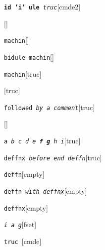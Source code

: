 \documentclass{book}
\begin{document}
%
\noindent\texttt{\textbf{id `\texttt{i}' ule} \bgroup{}\normalfont{}\textsl{truc}\egroup{}}\hfill[cmde2]



%
\noindent\texttt{}\hfill[]



\noindent\texttt{machin}\hfill[]



%
\noindent\texttt{bidule machin}\hfill[]



%
\noindent\texttt{machin}\hfill[truc]



%
\noindent\texttt{}\hfill[truc]



\noindent\texttt{followed \bgroup{}\normalfont{}\textsl{by a comment}\egroup{}}\hfill[truc]



%
\noindent\texttt{}\hfill[]



\noindent\texttt{a \bgroup{}\normalfont{}\textsl{b c d e \textbf{f g} h i}\egroup{}}\hfill[truc]



%
\noindent\texttt{deffnx \bgroup{}\normalfont{}\textsl{before end deffn}\egroup{}}\hfill[truc]



%


\noindent\texttt{deffn}\hfill[empty]



%

\noindent\texttt{deffn \bgroup{}\normalfont{}\textsl{with deffnx}\egroup{}}\hfill[empty]



%
\noindent\texttt{deffnx}\hfill[empty]



%

\noindent\texttt{\textsl{i} \bgroup{}\normalfont{}\textsl{a g}\egroup{}}\hfill[fset]



%
\noindent\texttt{truc \bgroup{}\normalfont{}\textsl{}\egroup{}}\hfill[cmde]
\end{document}
